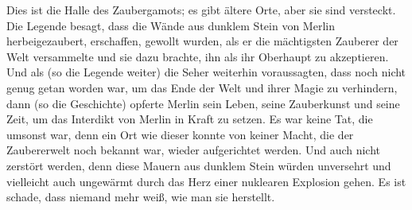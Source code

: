 Dies ist die Halle des Zaubergamots; es gibt ältere Orte, aber sie sind versteckt. Die Legende besagt, dass die Wände aus dunklem Stein von Merlin herbeigezaubert, erschaffen, gewollt wurden, als er die mächtigsten Zauberer der Welt versammelte und sie dazu brachte, ihn als ihr Oberhaupt zu akzeptieren. Und als (so die Legende weiter) die Seher weiterhin voraussagten, dass noch nicht genug getan worden war, um das Ende der Welt und ihrer Magie zu verhindern, dann (so die Geschichte) opferte Merlin sein Leben, seine Zauberkunst und seine Zeit, um das Interdikt von Merlin in Kraft zu setzen. Es war keine Tat, die umsonst war, denn ein Ort wie dieser konnte von keiner Macht, die der Zaubererwelt noch bekannt war, wieder aufgerichtet werden. Und auch nicht zerstört werden, denn diese Mauern aus dunklem Stein würden unversehrt und vielleicht auch ungewärmt durch das Herz einer nuklearen Explosion gehen. Es ist schade, dass niemand mehr weiß, wie man sie herstellt.

